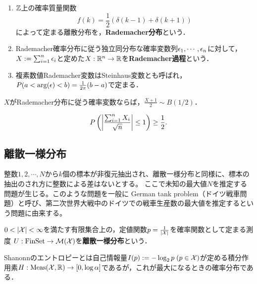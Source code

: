 \documentclass[uplatex,dvipdfmx]{jsreport}
\begin{document}
\begin{definition}\mbox{}
    \begin{enumerate}
        \item $\mathbb{Z}$上の確率質量関数
        \[f(k)=\frac{1}{2}(\delta(k-1)+\delta(k+1))\]
        によって定まる離散分布を，\textbf{Rademacher分布}という．
        \item Rademacher確率分布に従う独立同分布な確率変数列$\epsilon_1,\cdots,\epsilon_n$に対して，$X:=\sum^n_{i=1}\epsilon_i$と定めた$X:\mathbb{R}^n\to\mathbb{R}$を\textbf{Rademacher過程}という．
        \item 複素数値Rademacher変数はSteinhaus変数とも呼ばれ，$P(a<\arg(\epsilon)<b)=\frac{1}{2\pi}(b-a)$で定まる．
    \end{enumerate}
\end{definition}
\begin{remark}
    $X$がRademacher分布に従う確率変数ならば，$\frac{X+1}{2}\sim B(1/2)$．
\end{remark}

\begin{proposition}
    \[P\left(\left|\frac{\sum^n_{i=1}X_i}{\sqrt{n}}\right|\le 1\right)\ge\frac{1}{2}.\]
\end{proposition}

\subsection{離散一様分布}

\begin{tcolorbox}[colframe=ForestGreen, colback=ForestGreen!10!white,breakable,colbacktitle=ForestGreen!40!white,coltitle=black,fonttitle=\bfseries\sffamily,
title=]
    整数$ 1, 2, \cdots, N$から$k$個の標本が非復元抽出され、離散一様分布と同様に、標本の抽出のされ方に整数による差はないとする。
    ここで未知の最大値$ N $を推定する問題が生じる。このような問題を一般に German tank problem（ドイツ戦車問題）と呼び、第二次世界大戦中のドイツでの戦車生産数の最大値を推定するという問題に由来する。 
\end{tcolorbox}

\begin{definition}
    $0<\lvert\mathcal{X}\rvert<\infty$を満たす有限集合上の，定値関数$p=\frac{1}{\lvert\mathcal{X}\rvert}$を確率関数として定まる測度
    $U:\mathrm{FinSet}\to\mathcal{M}(\mathcal{X})$を\textbf{離散一様分布}という．
\end{definition}
\begin{remarks}
    Shanonnのエントロピーとは自己情報量$I(p):=-\log_2p\;(p\in\mathcal{X})$が定める積分作用素$H:\mathrm{Meas}(\mathcal{X},\mathbb{R})\to[0,\log\alpha]$であるが，これが最大になるときの確率分布である．
\end{remarks}
\end{document}
